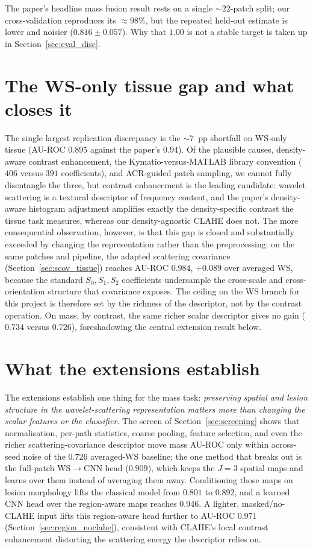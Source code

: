 The paper's headline mass fusion result rests on a single ${\sim}22$-patch split; our
cross-validation reproduces its ${\approx}98\%$, but the repeated held-out estimate is
lower and noisier ($0.816 \pm 0.057$). Why that $1.00$ is not a stable target is taken
up in Section~\ref{sec:eval_disc}.

\section{The WS-only tissue gap and what closes it}

The single largest replication discrepancy is the ${\sim}7$~pp shortfall on WS-only tissue
(AU-ROC $0.895$ against the paper's $0.94$). Of the plausible causes, density-aware
contrast enhancement, the Kymatio-versus-MATLAB library convention ($406$ versus $391$
coefficients), and ACR-guided patch sampling, we cannot fully disentangle the three, but
contrast enhancement is the leading candidate: wavelet scattering is a textural descriptor of
frequency content, and the paper's density-aware histogram adjustment amplifies exactly the
density-specific contrast the tissue task measures, whereas our density-agnostic CLAHE does not. The more consequential
observation, however, is that this gap is closed and substantially exceeded by
changing the representation rather than the preprocessing: on the same patches and pipeline,
the adapted scattering covariance (Section~\ref{sec:scov_tissue}) reaches AU-ROC $0.984$,
$+0.089$ over averaged WS, because the standard $S_0, S_1, S_2$ coefficients undersample the
cross-scale and cross-orientation structure that covariance exposes. The ceiling on the WS
branch for this project is therefore set by the richness of the descriptor, not by the
contrast operation. On mass, by contrast, the same richer scalar descriptor gives no
gain ($0.734$ versus $0.726$), foreshadowing the central extension result below.

\section{What the extensions establish}

The extensions establish one thing for the mass task: \emph{preserving
spatial and lesion structure in the wavelet-scattering representation matters more than
changing the scalar features or the classifier}. The screen of
Section~\ref{sec:screening} shows that normalisation, per-path statistics, coarse pooling,
feature selection, and even the richer scattering-covariance descriptor move mass AU-ROC
only within across-seed noise of the $0.726$ averaged-WS baseline; the one method that
breaks out is the full-patch WS$\rightarrow$CNN head ($0.909$), which keeps the $J=3$
spatial maps and learns over them instead of averaging them away. Conditioning those maps
on lesion morphology lifts the classical model from $0.801$ to $0.892$, and a learned CNN
head over the region-aware maps reaches $0.946$. A lighter, masked/no-CLAHE input lifts this
region-aware head further to AU-ROC $0.971$ (Section~\ref{sec:region_noclahe}), consistent with
CLAHE's local contrast enhancement distorting the scattering energy the descriptor relies on.

